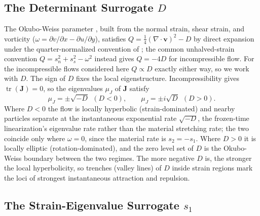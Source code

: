 \documentclass[lettersize,journal]{IEEEtran}
\begin{document}
\subsection{The Determinant Surrogate $D$}

The Okubo-Weiss parameter \cite{28,29}, built from the normal strain,
shear strain, and vorticity
($\omega = \partial v/\partial x - \partial u/\partial y$), satisfies
$Q = \tfrac{1}{4}(\nabla \cdot \mathbf{v})^2 - D$ by direct expansion
under the quarter-normalized convention of \cite{31}; the common
unhalved-strain convention $Q = s_n^2 + s_s^2 - \omega^2$ instead gives
$Q = -4D$ for incompressible flow. For the incompressible flows
considered here $Q \propto D$ exactly either way, so we
work with $D$. The sign of $D$ fixes the local eigenstructure.
Incompressibility gives $\operatorname{tr}(\mathbf{J}) = 0$, so the
eigenvalues $\mu_J$ of $\mathbf{J}$ satisfy
\begin{equation}
    \mu_J = \pm\sqrt{-D} \ \ (D < 0), \qquad
    \mu_J = \pm i\sqrt{D} \ \ (D > 0).
\end{equation}
Where $D < 0$ the flow is locally hyperbolic (strain-dominated) and
nearby particles separate at the instantaneous exponential rate
$\sqrt{-D}$, the frozen-time linearization's eigenvalue rate rather than
the material stretching rate; the two coincide only where $\omega = 0$,
since the material rate is $s_2 = -s_1$.
Where $D > 0$ it is locally elliptic (rotation-dominated),
and the zero level set of $D$ is the Okubo-Weiss boundary between the
two regimes. The more negative $D$ is, the stronger the local
hyperbolicity, so trenches (valley lines) of $D$ inside strain regions
mark the loci of strongest instantaneous attraction and repulsion.

\subsection{The Strain-Eigenvalue Surrogate $s_1$}
\label{sec:strain_field}
\end{document}
